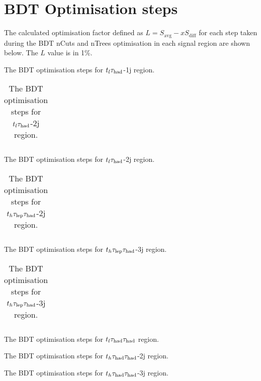 \section{BDT Optimisation steps}
\label{sec:BDTOptim}

The calculated optimisation factor defined as $L=S_\mathrm{avg}-xS_\mathrm{diff}$ for each step taken during the BDT nCuts and nTrees optimisation in each signal region are shown below. The $L$ value is in 1\%.

\begin{table}[H]
\caption{The BDT optimisation steps for $t_l\tau_\text{had}$-1j region.}

\end{table}
\begin{longtable}{|c|c|c|c|c|c|}
\caption{The BDT optimisation steps for $t_l\tau_\text{had}$-2j region.}\\\hline

\end{longtable}
\begin{table}[H]
\caption{The BDT optimisation steps for $t_l\tau_\text{had}$-2j region.}

\end{table}
\begin{longtable}{|c|c|c|c|c|c|}
\caption{The BDT optimisation steps for $t_h\tau_\text{lep}{}\tau_\text{had}$-2j region.}\\\hline

\end{longtable}
\begin{table}[H]
\caption{The BDT optimisation steps for $t_h\tau_\text{lep}{}\tau_\text{had}$-3j region.}

\end{table}
\begin{longtable}{|c|c|c|c|c|c|c|}
\caption{The BDT optimisation steps for $t_h\tau_\text{lep}{}\tau_\text{had}$-3j region.}\\\hline

\end{longtable}
\begin{table}[H]
\caption{The BDT optimisation steps for $t_l\tau_\text{had}{}\tau_\text{had}$ region.}

\end{table}
\begin{table}[H]
\caption{The BDT optimisation steps for $t_h\tau_\text{had}{}\tau_\text{had}$-2j region.}

\end{table}
\begin{table}[H]
\caption{The BDT optimisation steps for $t_h\tau_\text{had}{}\tau_\text{had}$-3j region.}

\end{table}